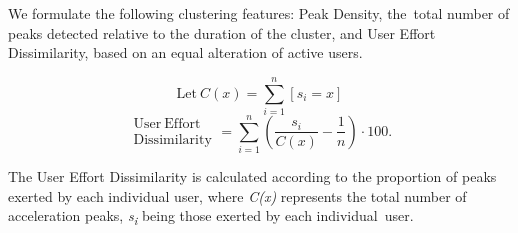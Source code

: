 We formulate the following clustering features:
Peak Density, the~total number of peaks detected relative to the duration of the cluster, and User Effort Dissimilarity, based on an equal alteration of active users.

\[
 \mathrm{Let}\ C(x)=\sum_{i=1}^{n}[s_i=x]
\]
\begin{equation}
\begin{split}
\mathrm{User\ Effort\ }\\ \mathrm{Dissimilarity}
\end{split}
= \sum_{i=1}^{n} (\frac{s_i}{C(x)} - \frac{1}{n})\cdot100 .
\end{equation}

The User Effort Dissimilarity is calculated according to the proportion of peaks exerted by each individual user, where \textit{C(x)} represents the total number of acceleration peaks, \textit{s\textsubscript{i}} being those exerted by each individual~user.

%


